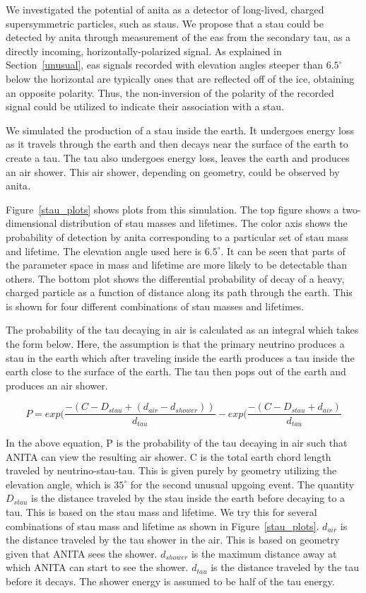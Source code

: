 We investigated the potential of \gls{anita} as a detector of long-lived, charged supersymmetric particles, such as staus. We propose that a stau could be detected by \gls{anita} through measurement of the \gls{eas} from the secondary tau, as a directly incoming, horizontally-polarized signal.
As explained in Section~\ref{unusual}, \gls{eas} signals recorded with elevation angles steeper than $6.5^{\circ}$ below the horizontal are typically ones that are reflected off of the ice, obtaining an opposite polarity. Thus, the non-inversion of the polarity of the recorded signal could be utilized to indicate their association with a stau.

We simulated the production of a stau inside the earth. It undergoes energy loss as it travels through the earth and then decays near the surface of the earth to create a tau. The tau also undergoes energy loss, leaves the earth and produces an air shower. This air shower, depending on geometry, could be observed by \gls{anita}. 

Figure~\ref{stau_plots} shows plots from this simulation. The top figure shows a two-dimensional distribution of stau masses and lifetimes. The color axis shows the probability of detection by \gls{anita} corresponding to a particular set of stau mass and lifetime. The elevation angle used here is $6.5^{\circ}$. It can be seen that parts of the parameter space in mass and lifetime are more likely to be detectable than others. The bottom plot shows the 
differential probability of decay of a heavy, charged particle as a function of distance along its path through the earth. This is shown for four different combinations of stau masses and lifetimes. 

The probability of the tau decaying in air is calculated as an integral which takes the form below. Here, the assumption is that the primary neutrino produces a stau in the earth which after traveling inside the earth produces a tau inside the earth close to the surface of the earth. The tau then pops out of the earth and produces an air shower. 

\begin{equation*}
P = exp( \frac{-(C - D_{stau} + (d_{air} - d_{shower}))}{d_{tau}}
- exp( \frac{-(C - D_{stau} + d_{air})}{d_{tau}}
\label{stau_integral}
\end{equation*}

In the above equation, P is the probability of the tau decaying in air such that ANITA can view the resulting air shower.
C is the total earth chord length traveled by neutrino-stau-tau. This is given purely by geometry utilizing the elevation angle, which is $35^{\circ}$ for the second unusual upgoing event. 
The quantity $D_{stau}$ is the distance traveled by the stau inside the earth before decaying to a tau. This is based on the stau mass and lifetime. We try this for several combinations of stau mass and lifetime as shown in Figure~\ref{stau_plots}.
$d_{air}$ is the distance traveled by the tau shower in the air. This is based on geometry given that ANITA sees the shower.
$d_{shower}$ is the maximum distance away at which ANITA can start to see the shower. 
$d_{tau}$ is the distance traveled by the tau before it decays. The shower energy is assumed to be half of the tau energy.

